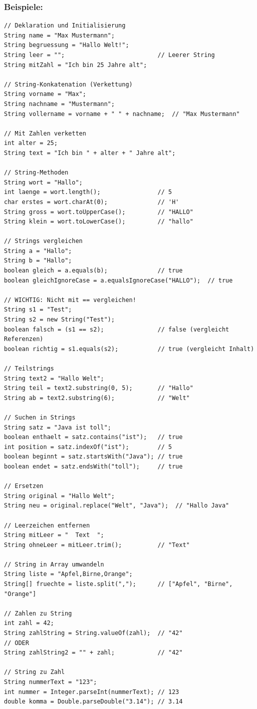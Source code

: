 \subsubsection*{Beispiele:}
\begin{lstlisting}
// Deklaration und Initialisierung
String name = "Max Mustermann";
String begruessung = "Hallo Welt!";
String leer = "";                          // Leerer String
String mitZahl = "Ich bin 25 Jahre alt";

// String-Konkatenation (Verkettung)
String vorname = "Max";
String nachname = "Mustermann";
String vollername = vorname + " " + nachname;  // "Max Mustermann"

// Mit Zahlen verketten
int alter = 25;
String text = "Ich bin " + alter + " Jahre alt";

// String-Methoden
String wort = "Hallo";
int laenge = wort.length();                // 5
char erstes = wort.charAt(0);              // 'H'
String gross = wort.toUpperCase();         // "HALLO"
String klein = wort.toLowerCase();         // "hallo"

// Strings vergleichen
String a = "Hallo";
String b = "Hallo";
boolean gleich = a.equals(b);              // true
boolean gleichIgnoreCase = a.equalsIgnoreCase("HALLO");  // true

// WICHTIG: Nicht mit == vergleichen!
String s1 = "Test";
String s2 = new String("Test");
boolean falsch = (s1 == s2);               // false (vergleicht Referenzen)
boolean richtig = s1.equals(s2);           // true (vergleicht Inhalt)

// Teilstrings
String text2 = "Hallo Welt";
String teil = text2.substring(0, 5);       // "Hallo"
String ab = text2.substring(6);            // "Welt"

// Suchen in Strings
String satz = "Java ist toll";
boolean enthaelt = satz.contains("ist");   // true
int position = satz.indexOf("ist");        // 5
boolean beginnt = satz.startsWith("Java"); // true
boolean endet = satz.endsWith("toll");     // true

// Ersetzen
String original = "Hallo Welt";
String neu = original.replace("Welt", "Java");  // "Hallo Java"

// Leerzeichen entfernen
String mitLeer = "  Text  ";
String ohneLeer = mitLeer.trim();          // "Text"

// String in Array umwandeln
String liste = "Apfel,Birne,Orange";
String[] fruechte = liste.split(",");      // ["Apfel", "Birne", "Orange"]

// Zahlen zu String
int zahl = 42;
String zahlString = String.valueOf(zahl);  // "42"
// ODER
String zahlString2 = "" + zahl;            // "42"

// String zu Zahl
String nummerText = "123";
int nummer = Integer.parseInt(nummerText); // 123
double komma = Double.parseDouble("3.14"); // 3.14
\end{lstlisting}

